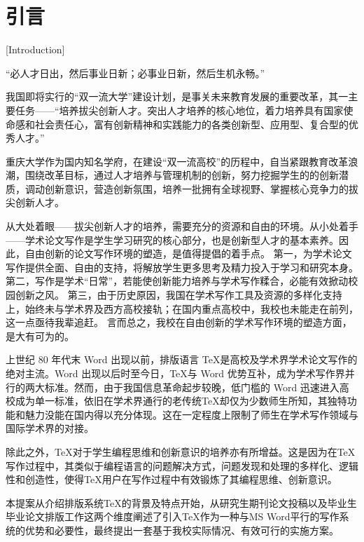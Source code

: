 \section{引言}[Introduction]

“必人才日出，然后事业日新；必事业日新，然后生机永畅。”

我国即将实行的“双一流大学”建设计划，是事关未来教育发展的重要改革，其一主要任务——“培养拔尖创新人才。突出人才培养的核心地位，着力培养具有国家使命感和社会责任心，富有创新精神和实践能力的各类创新型、应用型、复合型的优秀人才。”

重庆大学作为国内知名学府，在建设“双一流高校”的历程中，自当紧跟教育改革浪潮，围绕改革目标，通过人才培养与管理机制的创新，努力挖掘学生的的创新潜质，调动创新意识，营造创新氛围，培养一批拥有全球视野、掌握核心竞争力的拔尖创新人才。

从大处着眼——拔尖创新人才的培养，需要充分的资源和自由的环境。从小处着手——学术论文写作是学生学习研究的核心部分，也是创新型人才的基本素养。因此，自由创新的论文写作环境的塑造，是值得提倡的着手点。
第一，为学术论文写作提供全面、自由的支持，将解放学生更多思考及精力投入于学习和研究本身。
第二，写作是学术“日常”，若能使创新能力培养与学术写作糅合，必能有效掀动校园创新之风。
第三，由于历史原因，我国在学术写作工具及资源的多样化支持上，始终未与学术界及西方高校接轨；在国内重点高校中，我校也未能走在前列，这一点亟待我辈追赶。
言而总之，我校在自由创新的学术写作环境的塑造方面，是大有可为的。


上世纪 80 年代末 Word 出现以前，排版语言 \TeX 是高校及学术界学术论文写作的绝对主流。Word 出现以后时至今日，\TeX  与 Word 优势互补，成为学术写作界并行的两大标准。然而，由于我国信息革命起步较晚，低门槛的 Word 迅速进入高校成为单一标准，依旧在学术界通行的老传统\TeX 却仅为少数师生所知，其独特功能和魅力没能在国内得以充分体现。这在一定程度上限制了师生在学术写作领域与国际学术界的对接。

除此之外，\TeX 对于学生编程思维和创新意识的培养亦有所增益。这是因为在\TeX 写作过程中，其类似于编程语言的问题解决方式，问题发现和处理的多样化、逻辑性和创造性，使得\TeX 用户在写作过程中有效锻炼了其编程思维、创新意识。

本提案从介绍排版系统\TeX 的背景及特点开始，从研究生期刊论文投稿以及毕业生毕业论文排版工作这两个维度阐述了引入\TeX 作为一种与MS Word平行的写作系统的优势和必要性，最终提出一套基于我校实际情况、有效可行的实施方案。


